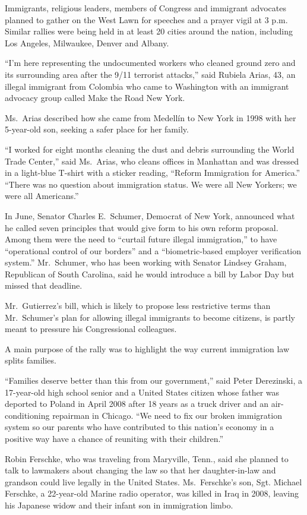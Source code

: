 ﻿\documentclass[12pt]{article}
\begin{document}
Immigrants, religious leaders, members of Congress and immigrant advocates planned to gather on the
West Lawn for speeches and a prayer vigil at 3 p.m. Similar rallies were being held in at least 20
cities around the nation, including Los Angeles, Milwaukee, Denver and Albany.

``I'm here representing the undocumented workers who cleaned ground zero and its surrounding area
after the 9/11 terrorist attacks,'' said Rubiela Arias, 43, an illegal immigrant from Colombia who
came to Washington with an immigrant advocacy group called Make the Road New York.

Ms.~Arias described how she came from Medellín to New York in 1998 with her 5-year-old son, seeking
a safer place for her family.

``I worked for eight months cleaning the dust and debris surrounding the World Trade Center,'' said
Ms.~Arias, who cleans offices in Manhattan and was dressed in a light-blue T-shirt with a sticker
reading, ``Reform Immigration for America.'' ``There was no question about immigration status. We
were all New Yorkers; we were all Americans.''

In June, Senator Charles E.~Schumer, Democrat of New York, announced what he called seven principles
that would give form to his own reform proposal. Among them were the need to ``curtail future
illegal immigration,'' to have ``operational control of our borders'' and a ``biometric-based
employer verification system.'' Mr.~Schumer, who has been working with Senator Lindsey Graham,
Republican of South Carolina, said he would introduce a bill by Labor Day but missed that deadline.

Mr.~Gutierrez's bill, which is likely to propose less restrictive terms than Mr.~Schumer's plan for
allowing illegal immigrants to become citizens, is partly meant to pressure his Congressional
colleagues.

A main purpose of the rally was to highlight the way current immigration law splits families.

``Families deserve better than this from our government,'' said Peter Derezinski, a 17-year-old high
school senior and a United States citizen whose father was deported to Poland in April 2008 after 18
years as a truck driver and an air-conditioning repairman in Chicago. ``We need to fix our broken
immigration system so our parents who have contributed to this nation's economy in a positive way
have a chance of reuniting with their children.''

Robin Ferschke, who was traveling from Maryville, Tenn., said she planned to talk to lawmakers about
changing the law so that her daughter-in-law and grandson could live legally in the United States.
Ms.~Ferschke's son, Sgt. Michael Ferschke, a 22-year-old Marine radio operator, was killed in Iraq
in 2008, leaving his Japanese widow and their infant son in immigration limbo.
\end{document}
